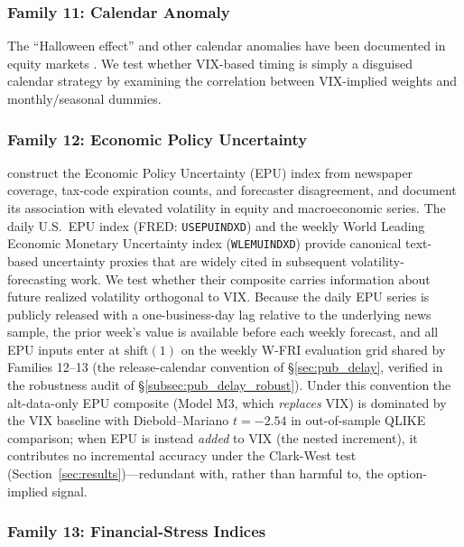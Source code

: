 \documentclass[12pt,a4paper]{article}
\begin{document}
\subsubsection{Family 11: Calendar Anomaly}

The ``Halloween effect'' and other calendar anomalies have been documented in equity markets \citep{bouman2002}. We test whether VIX-based timing is simply a disguised calendar strategy by examining the correlation between VIX-implied weights and monthly/seasonal dummies.

\subsubsection{Family 12: Economic Policy Uncertainty}

\citet{baker2016} construct the Economic Policy Uncertainty (EPU) index from newspaper coverage, tax-code expiration counts, and forecaster disagreement, and document its association with elevated volatility in equity and macroeconomic series. The daily U.S.\ EPU index (FRED: \texttt{USEPUINDXD}) and the weekly World Leading Economic Monetary Uncertainty index (\texttt{WLEMUINDXD}) provide canonical text-based uncertainty proxies that are widely cited in subsequent volatility-forecasting work. We test whether their composite carries information about future realized volatility orthogonal to VIX. Because the daily EPU series is publicly released with a one-business-day lag relative to the underlying news sample, the prior week's value is available before each weekly forecast, and all EPU inputs enter at $\text{shift}(1)$ on the weekly W-FRI evaluation grid shared by Families 12--13 (the release-calendar convention of \S\ref{sec:pub_delay}, verified in the robustness audit of \S\ref{subsec:pub_delay_robust}). Under this convention the alt-data-only EPU composite (Model M3, which \emph{replaces} VIX) is dominated by the VIX baseline with Diebold--Mariano $t=-2.54$ in out-of-sample QLIKE comparison; when EPU is instead \emph{added} to VIX (the nested increment), it contributes no incremental accuracy under the Clark-West test (Section~\ref{sec:results})---redundant with, rather than harmful to, the option-implied signal.

\subsubsection{Family 13: Financial-Stress Indices}
\end{document}
